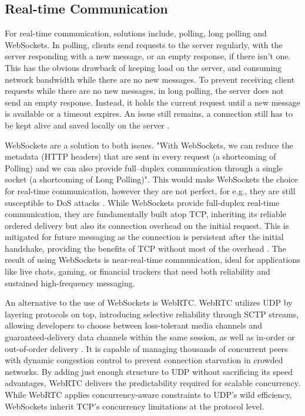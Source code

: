 \documentclass[]{final}
\begin{document}
\subsection{Real-time Communication}

For real-time communication, solutions include, polling, long polling and WebSockets. In polling,
clients send requests to the server regularly, with the server responding with a new message, or
an empty response, if there isn't one. This has the obvious drawback of keeping load on the server,
and consuming network bandwidth while there are no new messages. To prevent receiving client requests
while there are no new messages, in long polling, the server does not send an empty response. Instead,
it holds the current request until a new message is available or a timeout expires. An issue still remains,
a connection still has to be kept alive and saved locally on the server \cite{gupta_overview_2018}.

WebSockets are a solution to both issues. "With WebSockets, we can reduce the metadata (HTTP headers) that are sent in
every request (a shortcoming of Polling) and we can also provide full–duplex communication through a
single socket (a shortcoming of Long Polling)". This would make WebSockets the choice for real-time
communication, however they are not perfect, for e.g., they are still susceptible to DoS attacks
\cite{gupta_overview_2018}. While WebSockets provide full-duplex real-time communication, they are
fundamentally built atop TCP, inheriting its reliable ordered delivery but
also its connection overhead on the initial request. This is mitigated for
future messaging as the connection is persistent after the initial
handshake, providing the benefits of TCP without most of the overhead \cite{gupta_overview_2018}.
The result of using WebSockets is near-real-time communication, ideal for
applications like live chats, gaming, or financial trackers that need both
reliability and sustained high-frequency messaging.

An alternative to the use of WebSockets is WebRTC. WebRTC utilizes UDP by
layering protocols on top, introducing selective reliability through SCTP
streams, allowing developers to choose between loss-tolerant media channels and
guaranteed-delivery data channels within the same session, as well as
in-order or out-of-order delivery \cite{sredojev_webrtc_2015}. It is capable of
managing thousands of concurrent peers with dynamic congestion control to
prevent connection starvation in crowded networks. By
adding just enough structure to UDP without sacrificing its speed advantages,
WebRTC delivers the predictability required for scalable concurrency.
While WebRTC applies concurrency-aware constraints to UDP's wild efficiency,
WebSockets inherit TCP's concurrency limitations at the protocol level.
\end{document}
